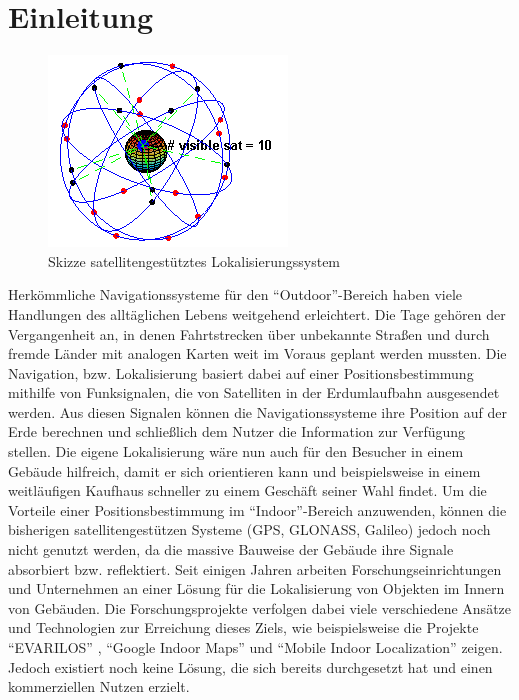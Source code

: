 \chapter{Einleitung}
\begin{figure}
\centering
\includegraphics[scale=0.8]{Bilder/GPS.png} 
\caption{Skizze satellitengestütztes Lokalisierungssystem \cite{GPS}}
\label{GPS}
\end{figure}
Herkömmliche Navigationssysteme für den "`Outdoor"'-Bereich haben viele Handlungen des alltäglichen Lebens weitgehend erleichtert. Die Tage gehören der Vergangenheit an, in denen Fahrtstrecken über unbekannte Straßen und durch fremde Länder mit analogen Karten weit im Voraus geplant werden mussten. Die Navigation, bzw. Lokalisierung basiert dabei auf einer Positionsbestimmung mithilfe von Funksignalen, die von Satelliten in der Erdumlaufbahn ausgesendet werden. Aus diesen Signalen können die Navigationssysteme ihre Position auf der Erde berechnen und schließlich dem Nutzer die Information zur Verfügung stellen. Die eigene Lokalisierung wäre nun auch für den Besucher in einem Gebäude hilfreich, damit er sich orientieren kann und beispielsweise in einem weitläufigen Kaufhaus schneller zu einem Geschäft seiner Wahl findet. Um die Vorteile einer Positionsbestimmung im "`Indoor"'-Bereich anzuwenden, können die bisherigen satellitengestützen Systeme (GPS, GLONASS, Galileo) jedoch noch nicht genutzt werden, da die massive Bauweise der Gebäude ihre Signale absorbiert bzw. reflektiert. Seit einigen Jahren arbeiten Forschungseinrichtungen und Unternehmen an einer Lösung für die Lokalisierung von Objekten im Innern von Gebäuden. Die Forschungsprojekte verfolgen dabei viele verschiedene Ansätze und Technologien zur Erreichung dieses Ziels, wie beispielsweise die Projekte "`EVARILOS"' \cite{EVA}, "`Google Indoor Maps"' \cite{GIM} und "`Mobile Indoor Localization"' \cite{MIL} zeigen. Jedoch existiert noch keine Lösung, die sich bereits durchgesetzt hat und einen kommerziellen Nutzen erzielt.\\ \\
